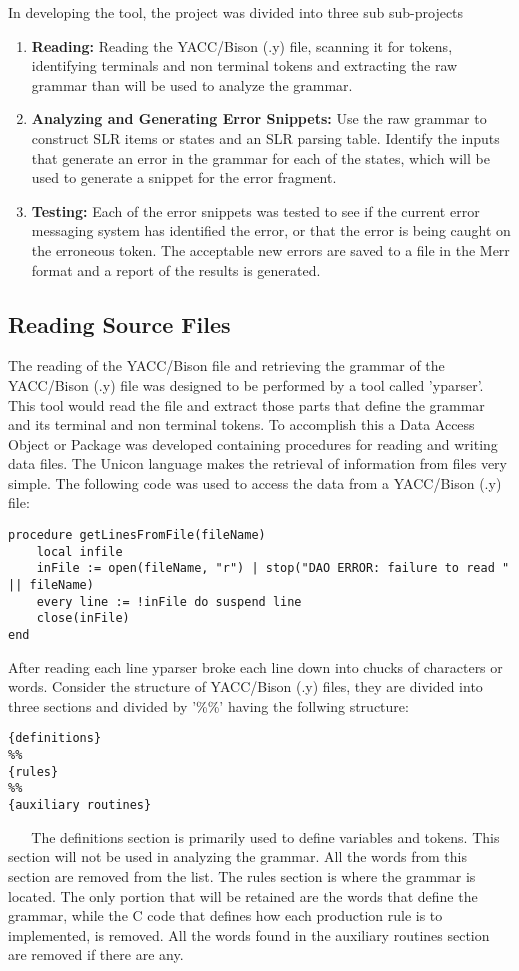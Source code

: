 \documentclass{article}
\begin{document}
In developing the tool, the project was divided into three sub sub-projects
\begin{enumerate}
\item \textbf{Reading:} Reading the YACC/Bison (.y) file, scanning it for tokens, identifying terminals and non terminal tokens and extracting the raw grammar than will be used to analyze the grammar.
\item \textbf{Analyzing and Generating Error Snippets:} Use the raw grammar to construct SLR items or states and an SLR parsing table.  Identify the inputs that generate an error in the grammar for each of the states, which will be used to generate a snippet for the error fragment.
\item \textbf{Testing:} Each of the error snippets was tested to see if the current error messaging system has identified the error, or that the error is being caught on the erroneous token.  The acceptable new errors are saved to a file in the Merr format and a report of the results is generated.
\end{enumerate}

\subsection{Reading Source Files}
The reading of the YACC/Bison file and retrieving the grammar of the YACC/Bison (.y) file was designed to be performed by a tool called 'yparser'.  This tool would read the file and extract those parts that define the grammar and its terminal and non terminal tokens.  To accomplish this a Data Access Object or Package was developed containing procedures for reading and writing data files.  The Unicon language makes the retrieval of information from files very simple.  The following code was used to access the data from a YACC/Bison (.y) file:

\begin{verbatim}
procedure getLinesFromFile(fileName)
	local infile
	inFile := open(fileName, "r") | stop("DAO ERROR: failure to read " || fileName)
	every line := !inFile do suspend line
	close(inFile)
end
\end{verbatim}

After reading each line yparser broke each line down into chucks of characters or words. Consider the structure of YACC/Bison (.y) files, they are divided into three sections and divided by '\%\%' having the follwing structure:
\begin{verbatim}
{definitions}
%%
{rules}
%%
{auxiliary routines}
\end{verbatim}~\cite{louden}  ~\cite{levine}
The definitions section is primarily used to define variables and tokens.  This section will not be used in analyzing the grammar.  All the words from this section are removed from the list.  The rules section is where the grammar is located.  The only portion that will be retained are the words that define the grammar, while the C code that defines how each production rule is to implemented, is removed.  All the words found in the auxiliary routines section are removed if there are any. 
\end{document}
